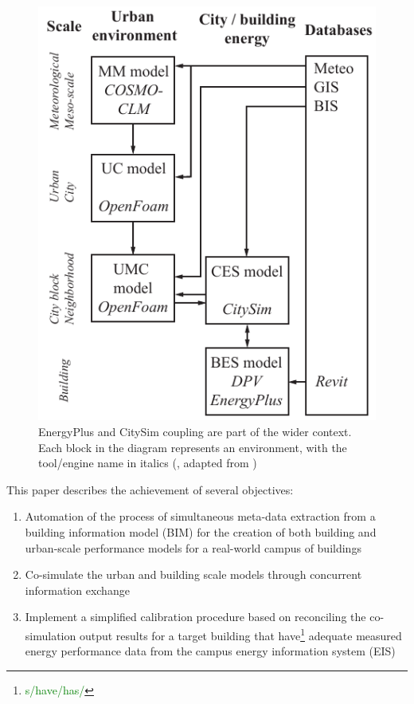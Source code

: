 \documentclass{tBPS2e}
\theoremstyle{plain}
\theoremstyle{definition}
\theoremstyle{remark}
\newcommand{\noteDT}[1]{\footnote{\textcolor{green}{#1}}}
\begin{document}
\begin{figure}
\centering
\includegraphics[scale=0.7]{figures/UMEM_overview_new}
\caption{EnergyPlus and CitySim coupling are part of the wider context. Each block in the diagram represents an environment, with the tool/engine name in italics (\citep{thomas2014multiscale}, adapted from \citep{Dorer:2013vt})}
\label{fig:UMEM}
\end{figure}

This paper describes the achievement of several objectives:
\begin{enumerate}
  \item Automation of the process of simultaneous meta-data extraction from a building information model (BIM) for the creation of both building and urban-scale performance models for a real-world campus of buildings
  \item Co-simulate the urban and building scale models through concurrent information exchange
  \item Implement a simplified calibration procedure based on reconciling the co-simulation output results for a target building that have\noteDT{s/have/has/} adequate measured energy performance data from the campus energy information system (EIS) 
\end{enumerate}
\end{document}
